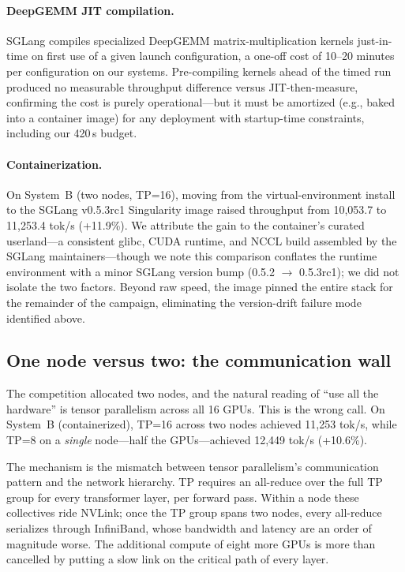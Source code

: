 \documentclass[sigconf]{acmart}
\begin{document}
\paragraph{DeepGEMM JIT compilation.}
SGLang compiles specialized DeepGEMM matrix-multiplication kernels just-in-time on first use of a given launch configuration, a one-off cost of 10--20 minutes per configuration on our systems. Pre-compiling kernels ahead of the timed run produced no measurable throughput difference versus JIT-then-measure, confirming the cost is purely operational---but it must be amortized (e.g., baked into a container image) for any deployment with startup-time constraints, including our 420\,s budget.

\paragraph{Containerization.}
On System~B (two nodes, TP=16), moving from the virtual-environment install to the SGLang v0.5.3rc1 Singularity image raised throughput from 10{,}053.7 to 11{,}253.4 tok/s (+11.9\%). We attribute the gain to the container's curated userland---a consistent glibc, CUDA runtime, and NCCL build assembled by the SGLang maintainers---though we note this comparison conflates the runtime environment with a minor SGLang version bump (0.5.2 $\rightarrow$ 0.5.3rc1); we did not isolate the two factors. Beyond raw speed, the image pinned the entire stack for the remainder of the campaign, eliminating the version-drift failure mode identified above.

\subsection{One node versus two: the communication wall}
\label{sec:scaling}
The competition allocated two nodes, and the natural reading of ``use all the hardware'' is tensor parallelism across all 16 GPUs. This is the wrong call. On System~B (containerized), TP=16 across two nodes achieved 11{,}253 tok/s, while TP=8 on a \emph{single} node---half the GPUs---achieved 12{,}449 tok/s (+10.6\%).

The mechanism is the mismatch between tensor parallelism's communication pattern and the network hierarchy. TP requires an all-reduce over the full TP group for every transformer layer, per forward pass. Within a node these collectives ride NVLink; once the TP group spans two nodes, every all-reduce serializes through InfiniBand, whose bandwidth and latency are an order of magnitude worse. The additional compute of eight more GPUs is more than cancelled by putting a slow link on the critical path of every layer.
\end{document}
